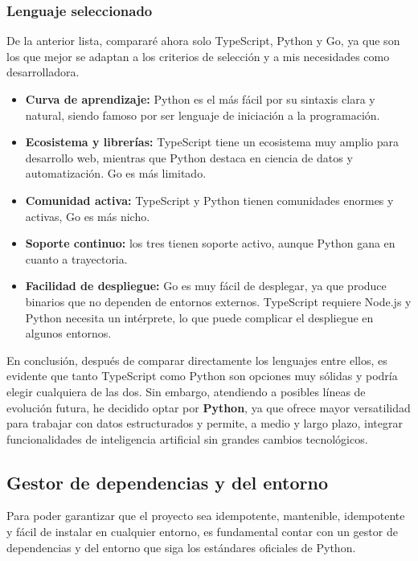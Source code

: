 \subsubsection{Lenguaje seleccionado}
De la anterior lista, compararé ahora solo TypeScript, Python y Go, ya que son los que
mejor se adaptan a los criterios de selección y a mis necesidades como desarrolladora.

\begin{itemize}
    \item \textbf{Curva de aprendizaje:} Python es el más fácil por su sintaxis clara y
    natural, siendo famoso por ser lenguaje de iniciación a la programación.
    \item \textbf{Ecosistema y librerías:} TypeScript tiene un ecosistema muy amplio 
    para desarrollo web, mientras que Python destaca en ciencia de datos y automatización.
    Go es más limitado.
    \item \textbf{Comunidad activa:} TypeScript y Python tienen comunidades enormes y
    activas, Go es más nicho.
    \item \textbf{Soporte continuo:} los tres tienen soporte activo, aunque Python gana en
    cuanto a trayectoria.
    \item \textbf{Facilidad de despliegue:} Go es muy fácil de desplegar, ya que produce
    binarios que no dependen de entornos externos. TypeScript requiere Node.js
    y Python necesita un intérprete, lo que puede complicar el despliegue en algunos
    entornos.
\end{itemize}

En conclusión, después de comparar directamente los lenguajes entre ellos, es evidente
que tanto TypeScript como Python son opciones muy sólidas y podría elegir cualquiera de las
dos. Sin embargo, atendiendo a posibles líneas de evolución futura, he decidido optar por
\textbf{Python}, ya que ofrece mayor versatilidad para trabajar con datos estructurados y 
permite, a medio y largo plazo, integrar funcionalidades de inteligencia artificial sin 
grandes cambios tecnológicos.

\subsection{Gestor de dependencias y del entorno}
Para poder garantizar que el proyecto sea idempotente, mantenible, idempotente y fácil de instalar en 
cualquier entorno, es fundamental contar con un gestor de dependencias y del entorno que
siga los estándares oficiales de Python. 

